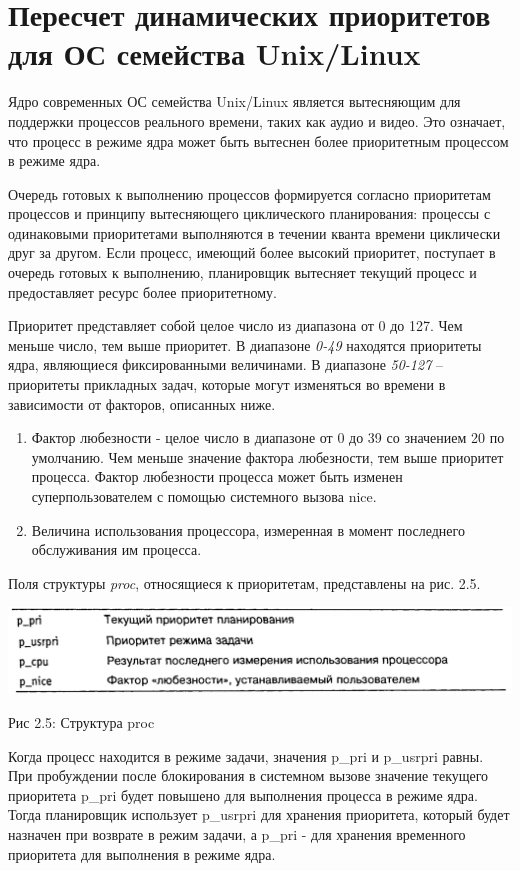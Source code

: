 \documentclass[12pt]{report}
\begin{document}
\section{Пересчет динамических приоритетов для ОС семейства Unix/Linux}

Ядро современных ОС семейства Unix/Linux является вытесняющим для поддержки процессов реального времени, таких как аудио и видео. Это означает, что процесс в режиме ядра может быть вытеснен более приоритетным процессом в режиме ядра.

Очередь готовых к выполнению процессов формируется согласно приоритетам процессов и принципу вытесняющего циклического планирования: процессы с одинаковыми приоритетами выполняются в течении кванта времени циклически друг за другом. Если процесс, имеющий более высокий приоритет, поступает в очередь готовых к выполнению, планировщик вытесняет текущий процесс и предоставляет ресурс более приоритетному.

Приоритет представляет собой целое число из диапазона от 0 до 127. Чем меньше число, тем выше приоритет. В диапазоне \textit{0-49} находятся приоритеты ядра, являющиеся фиксированными величинами. В диапазоне \textit{50-127} – приоритеты прикладных задач, которые могут изменяться во времени в зависимости от факторов, описанных ниже.
\begin{enumerate}
\item Фактор любезности - целое число в диапазоне от 0 до 39 со значением 20 по умолчанию. Чем меньше значение фактора любезности, тем выше приоритет процесса. Фактор любезности процесса может быть изменен суперпользователем с помощью системного вызова nice.
\item Величина использования процессора, измеренная в момент последнего обслуживания им процесса.
\end{enumerate}

Поля структуры \textit{proc}, относящиеся к приоритетам, представлены на рис. 2.5.

\begin{center}
		\includegraphics[scale=0.6]{pics/Proc.png}
		
			Рис 2.5: Структура proc
\end{center}

Когда процесс находится в режиме задачи, значения p\_pri и p\_usrpri равны. При пробуждении после блокирования в системном вызове значение текущего приоритета p\_pri  будет повышено для выполнения процесса в режиме ядра. Тогда планировщик использует p\_usrpri для хранения приоритета, который будет назначен при возврате в режим задачи, а p\_pri - для хранения временного приоритета для выполнения в режиме ядра.
\end{document}
